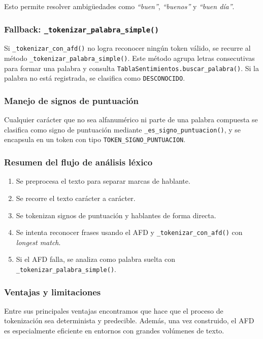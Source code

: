 Esto permite resolver ambigüedades como \textit{``buen''}, \textit{``buenos''} y \textit{``buen
	día''}.

\subsubsection{Fallback: \texttt{\_tokenizar\_palabra\_simple()}}
Si \texttt{\_tokenizar\_con\_afd()} no logra reconocer ningún token válido, se recurre al
método \texttt{\_tokenizar\_palabra\_simple()}. Este método agrupa letras consecutivas para
formar una palabra y consulta \texttt{TablaSentimientos.buscar\_palabra()}. Si la palabra no
está registrada, se clasifica como \texttt{DESCONOCIDO}.

\subsubsection{Manejo de signos de puntuación}
Cualquier carácter que no sea alfanumérico ni parte de una palabra compuesta se clasifica como
signo de puntuación mediante \texttt{\_es\_signo\_puntuacion()}, y se encapsula en un token con
tipo \texttt{TOKEN\_SIGNO\_PUNTUACION}.

\subsubsection{Resumen del flujo de análisis léxico}
\begin{enumerate}
	\item Se preprocesa el texto para separar marcas de hablante.
	\item Se recorre el texto carácter a carácter.
	\item Se tokenizan signos de puntuación y hablantes de forma directa.
	\item Se intenta reconocer frases usando el AFD y \texttt{\_tokenizar\_con\_afd()} con \textit{longest match}.
	\item Si el AFD falla, se analiza como palabra suelta con \texttt{\_tokenizar\_palabra\_simple()}.
\end{enumerate}

\subsubsection{Ventajas y limitaciones}
Entre sus principales ventajas encontramos que hace que el proceso de tokenización sea
determinista y predecible. Además, una vez construido, el AFD es especialmente eficiente en
entornos con grandes volúmenes de texto.

